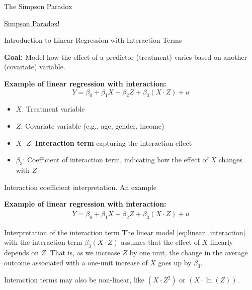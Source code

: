 \documentclass[aspectratio=169]{beamer}
\begin{document}
\begin{frame}{The Simpson Paradox}

    \begin{center}
        \vspace{0.3cm}

        \href{https://en.wikipedia.org/wiki/Simpson's_paradox}{Simpson Paradox!}
    \end{center}
    
\end{frame}

\begin{frame}{Introduction to Linear Regression with Interaction Terms}
    
    \textbf{Goal:} Model how the effect of a predictor (treatment) varies based on another (covariate) variable.
    
    \vspace{1em}
    \textbf{Example of linear regression with interaction:}
    \[
    Y = \beta_0 + \beta_1 X + \beta_2 Z + \beta_3 (X \cdot Z) + u
    \]

    \begin{itemize}
        \item \( X \): Treatment variable
        \item \( Z \): Covariate variable (e.g., age, gender, income)
        \item \( X \cdot Z \): \textbf{Interaction term} capturing the interaction effect
        \item \( \beta_3 \): Coefficient of interaction term, indicating how the effect of \( X \) changes with \( Z \)
    \end{itemize}
    
\end{frame}

\begin{frame}{Interaction coefficient interpretation. An example}

    \textbf{Example of linear regression with interaction:}
    \begin{align}\label{eq:linear_interaction}
        Y = \beta_0 + \beta_1 X + \beta_2 Z + \beta_3 (X \cdot Z) + u    
    \end{align}

    \begin{coolblock}{Interpretation of the interaction term}
        The linear model \eqref{eq:linear_interaction} with the interaction term $\beta_3(X \cdot Z)$ assumes that the effect of $X$ linearly depends on $Z$. That is, as we increase $Z$ by one unit, the change in the average outcome associated with a one-unit increase of $X$ goes up by $\beta_3$.
    \end{coolblock}
    \vspace{0.3cm}

    \begin{center}
        Interaction terms may also be non-linear, like $(X \cdot Z^2)$ or $(X \cdot \ln(Z))$.    
    \end{center}
    
\end{frame}
\end{document}
